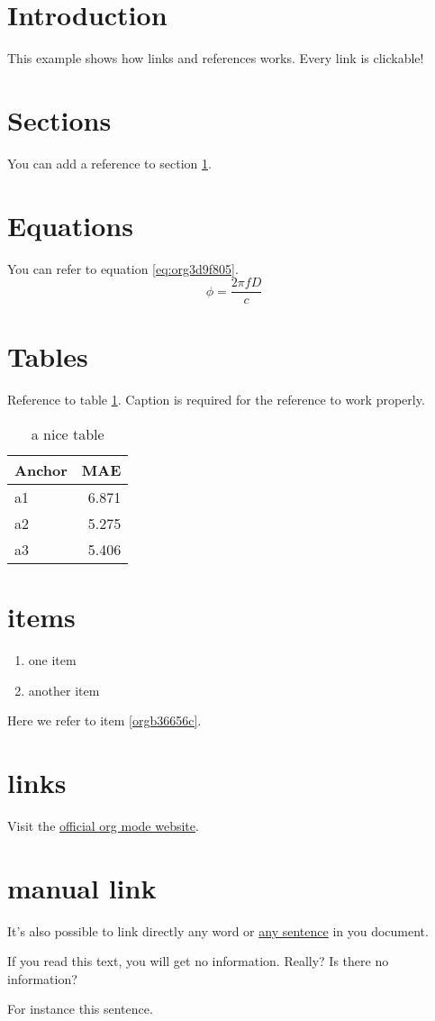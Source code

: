 


\section{Introduction}
\label{sec:orgc9445e4}
This example shows how links and references works.
Every link is clickable!

\section{Sections}
\label{sec:orga0c376a}
You can add a reference to section \ref{sec:orgc9445e4}.

\section{Equations}
\label{sec:org740ca06}
You can refer to equation \ref{eq:org3d9f805}.
\begin{equation}
\label{eq:org3d9f805}
\phi = \frac{2\pi fD}{c}
\end{equation}

\section{Tables}
\label{sec:orgaf947f9}
Reference to table \ref{tab:org5740e3f}.
Caption is required for the reference to work properly.

\begin{table}[htbp]
\caption{\label{tab:org5740e3f}
a nice table}
\centering
\begin{tabular}{lr}
Anchor & MAE\\
\hline
a1 & 6.871\\
a2 & 5.275\\
a3 & 5.406\\
\end{tabular}
\end{table}

\section{items}
\label{sec:org2c9dd14}
\begin{enumerate}
\item one item
\item \label{orgb36656c}another item
\end{enumerate}
Here we refer to item \ref{orgb36656c}.

\section{links}
\label{sec:org2218d3f}
Visit the \href{https://orgmode.org/}{official org mode website}.

\section{manual link}
\label{sec:org974b203}
It's also possible to link directly any word
or \hyperlink{thesentence}{any sentence} in you document.

If you read this text, you will get no information.  Really?
Is there no information?

For instance \hypertarget{thesentence}{this sentence}.


